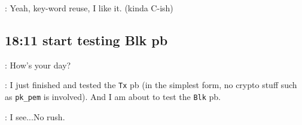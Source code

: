 \documentclass[dvipsnames]{article}
\begin{document}
 : Yeah, key-word reuse, I like it. (kinda C-ish)

\subsection*{18:11 start testing Blk pb}
 : How's your day?

 : I just finished and tested the \texttt{Tx} pb (in the simplest form, no
crypto stuff such as \texttt{pk\_pem} is involved). And I am about to test the
\texttt{Blk} pb.

 : I see...No rush.
\end{document}
